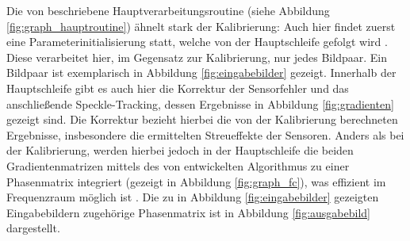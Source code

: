 Die von \citeauthor{Ber15} beschriebene Hauptverarbeitungsroutine (siehe Abbildung \ref{fig:graph_hauptroutine}) ähnelt stark der Kalibrierung: Auch hier findet zuerst eine Parameterinitialisierung statt, welche von der Hauptschleife gefolgt wird . Diese verarbeitet hier, im Gegensatz zur Kalibrierung, nur jedes Bildpaar. Ein Bildpaar ist exemplarisch in Abbildung \ref{fig:eingabebilder} gezeigt. Innerhalb der Hauptschleife gibt es auch hier die Korrektur der Sensorfehler und das anschließende Speckle-Tracking, dessen Ergebnisse in Abbildung \ref{fig:gradienten} gezeigt sind. Die Korrektur bezieht hierbei die von der Kalibrierung berechneten Ergebnisse, insbesondere die ermittelten Streueffekte der Sensoren. Anders als bei der Kalibrierung, werden hierbei jedoch in der Hauptschleife die beiden Gradientenmatrizen mittels des von \citeauthor{FC88} entwickelten Algorithmus zu einer Phasenmatrix integriert (gezeigt in Abbildung \ref{fig:graph_fc}), was effizient im Frequenzraum möglich ist \cite{FC88}. Die zu in Abbildung \ref{fig:eingabebilder} gezeigten Eingabebildern zugehörige Phasenmatrix ist in Abbildung \ref{fig:ausgabebild} dargestellt. 

